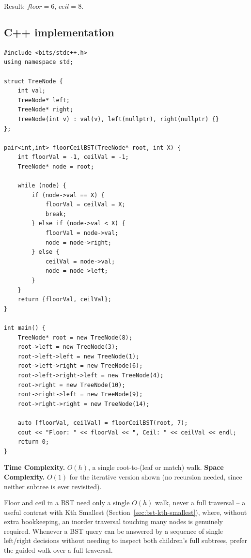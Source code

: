 Result: $\textit{floor}=6$, $\textit{ceil}=8$.

\subsection*{C++ implementation}

\begin{lstlisting}
#include <bits/stdc++.h>
using namespace std;

struct TreeNode {
    int val;
    TreeNode* left;
    TreeNode* right;
    TreeNode(int v) : val(v), left(nullptr), right(nullptr) {}
};

pair<int,int> floorCeilBST(TreeNode* root, int X) {
    int floorVal = -1, ceilVal = -1;
    TreeNode* node = root;

    while (node) {
        if (node->val == X) {
            floorVal = ceilVal = X;
            break;
        } else if (node->val < X) {
            floorVal = node->val;
            node = node->right;
        } else {
            ceilVal = node->val;
            node = node->left;
        }
    }
    return {floorVal, ceilVal};
}

int main() {
    TreeNode* root = new TreeNode(8);
    root->left = new TreeNode(3);
    root->left->left = new TreeNode(1);
    root->left->right = new TreeNode(6);
    root->left->right->left = new TreeNode(4);
    root->right = new TreeNode(10);
    root->right->left = new TreeNode(9);
    root->right->right = new TreeNode(14);

    auto [floorVal, ceilVal] = floorCeilBST(root, 7);
    cout << "Floor: " << floorVal << ", Ceil: " << ceilVal << endl;
    return 0;
}
\end{lstlisting}

\begin{complexitybox}
\textbf{Time Complexity.} $O(h)$, a single root-to-(leaf or match) walk.
\textbf{Space Complexity.} $O(1)$ for the iterative version shown (no
recursion needed, since neither subtree is ever revisited).
\end{complexitybox}

\begin{takeawaybox}
Floor and ceil in a BST need only a single $O(h)$ walk, never a full
traversal -- a useful contrast with Kth Smallest
(Section~\ref{sec:bst-kth-smallest}), where, without extra bookkeeping, an
inorder traversal touching many nodes is genuinely required. Whenever a
BST query can be answered by a sequence of single left/right decisions
without needing to inspect both children's full subtrees, prefer the
guided walk over a full traversal.
\end{takeawaybox}
